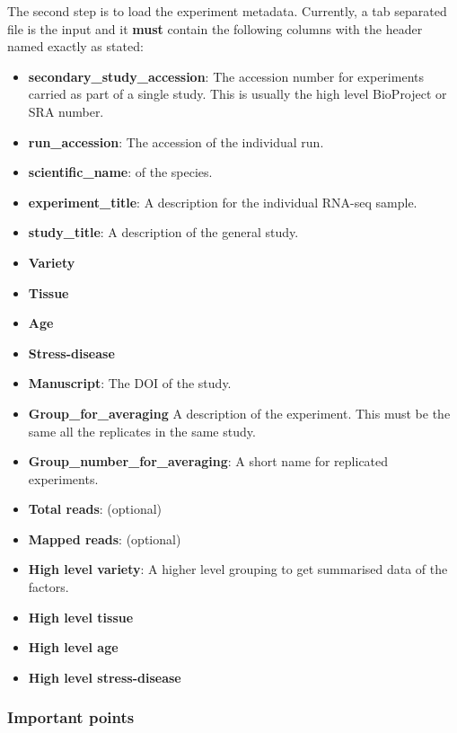 The second step is to load the experiment metadata. Currently, a tab
separated file is the input and it \textbf{must} contain the following
columns with the header named exactly as stated:

\begin{itemize}
\itemsep1pt\parskip0pt
\item
  \textbf{secondary\_study\_accession}: The accession number for
  experiments carried as part of a single study. This is usually the
  high level BioProject or SRA number.
\item
  \textbf{run\_accession}: The accession of the individual run.
\item
  \textbf{scientific\_name}: of the species.
\item
  \textbf{experiment\_title}: A description for the individual RNA-seq
  sample.
\item
  \textbf{study\_title}: A description of the general study.
\item
  \textbf{Variety}
\item
  \textbf{Tissue}
\item
  \textbf{Age}
\item
  \textbf{Stress-disease}
\item
  \textbf{Manuscript}: The DOI of the study.
\item
  \textbf{Group\_for\_averaging} A description of the experiment. This
  must be the same all the replicates in the same study.
\item
  \textbf{Group\_number\_for\_averaging}: A short name for replicated
  experiments.\\
\item
  \textbf{Total reads}: (optional)
\item
  \textbf{Mapped reads}: (optional)
\item
  \textbf{High level variety}: A higher level grouping to get summarised
  data of the factors.
\item
  \textbf{High level tissue}
\item
  \textbf{High level age}
\item
  \textbf{High level stress-disease}
\end{itemize}

\subsubsection{Important points}\label{important-points}

